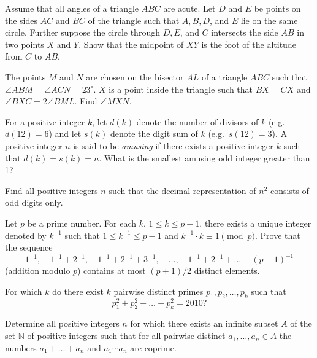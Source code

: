\documentclass[11pt,a4paper]{amsart}
\theoremstyle{definition}
\begin{document}
\prob
Assume that all angles of a triangle $ABC$ are acute. 
Let $D$ and $E$ be points on the sides $AC$ and $BC$ of the triangle such that $A, B, D$, and $E$ lie on the same circle. Further suppose the circle through $D, E$, and $C$ intersects the side $AB$ in two points $X$ and $Y$. Show that the midpoint of $XY$ is the foot of the altitude from $C$ to $AB$.


\prob
The points $M$ and $N$ are chosen on the bisector $AL$ of a triangle $ABC$
such that  $\angle ABM=\angle ACN=23^\circ$.
$X$ is a point inside the triangle such that $BX=CX$ and $\angle BXC=2\angle BML$.
Find $\angle MXN$.

\prob
For a positive integer $k$, let $d(k)$ denote the number of divisors of $k$ (e.g.\ $d(12) = 6$) and let $s(k)$ denote the digit sum of $k$ (e.g.\ $s(12) = 3$). A positive integer $n$ is said to be {\em amusing} if there exists a positive integer $k$ such that $d(k) = s(k) = n$. What is the smallest amusing odd integer greater than 1? 


\prob
Find all positive integers $n$ such that the decimal representation of $n^2$
consists of odd digits only.

\prob
Let $p$ be a prime number.
For each $k$, $1\le k\le p-1$, there exists a unique integer denoted by $k^{-1}$ such that  $1\le k^{-1}\le p-1$ and
$k^{-1}\cdot k\equiv 1\pmod p$.
Prove that the sequence
\[
1^{-1}, \quad 1^{-1}+2^{-1},\quad 1^{-1}+2^{-1}+3^{-1}, \quad\dots, \quad 1^{-1}+2^{-1}+\dots+(p-1)^{-1}
\]
(addition modulo $p$) contains at most $(p+1)/2$ distinct elements.

\prob
For which $k$ do there exist $k$ pairwise distinct primes $p_1, p_2, \dots, p_k$ such that
\[p_1^2+p_2^2+\dots+p_k^2=2010 ?\]

\prob
Determine all positive integers $n$ for which there exists an infinite subset $A$ of the set $\mathbb N$ of positive integers such that for all pairwise distinct $a_1, \dots, a_n \in A$ the numbers $a_1 + \dots + a_n$ and $a_1\cdots a_n$ are coprime.
\end{document}
